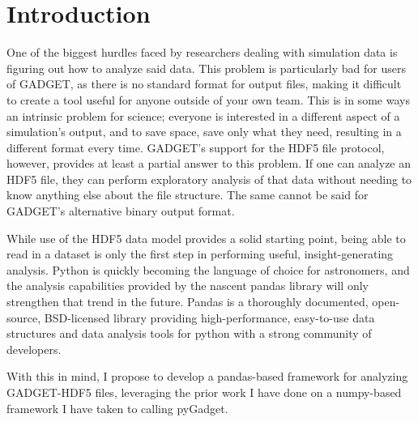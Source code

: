 \section{Introduction}
\label{intro}

One of the biggest hurdles faced by researchers dealing with simulation data is figuring out how to analyze said data.  This problem is particularly bad for users of GADGET, as there is no standard format for output files, making it difficult to create a tool useful for anyone outside of your own team.  This is in some ways an intrinsic problem for science; everyone is interested in a different aspect of a simulation’s output, and to save space, save only what they need, resulting in a different format every time.  GADGET’s support for the HDF5 file protocol, however, provides at least a partial answer to this problem.  If one can analyze an HDF5 file, they can perform exploratory analysis of that data without needing to know anything else about the file structure.  The same cannot be said for GADGET’s alternative binary output format.  

While use of the HDF5 data model provides a solid starting point, being able to read in a dataset is only the first step in performing useful, insight-generating analysis.  Python is quickly becoming the language of choice for astronomers, and the analysis capabilities provided by the nascent pandas library will only strengthen that trend in the future.  Pandas is a thoroughly documented, open-source, BSD-licensed library providing high-performance, easy-to-use data structures and data analysis tools for python with a strong community of developers.  

With this in mind, I propose to develop a pandas-based framework for analyzing GADGET-HDF5 files, leveraging the prior work I have done on a numpy-based framework I have taken to calling pyGadget.